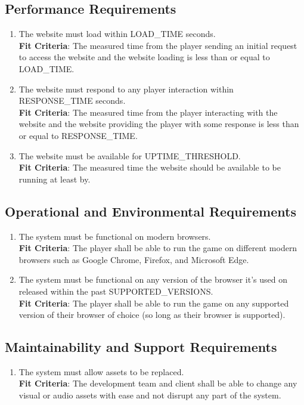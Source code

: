 \documentclass{article}
\begin{document}
\subsection{Performance Requirements}
\begin{enumerate}[{PR}1. ]
    \item The website must load within LOAD\_TIME seconds. \\
    \textbf{Fit Criteria}: The measured time from the player sending an initial request to access the website and the website loading is less than or equal to LOAD\_TIME.
    
    \item The website must respond to any player interaction within RESPONSE\_TIME seconds. \\
    \textbf{Fit Criteria}: The measured time from the player interacting with the website and the website providing the player with some response is less than or equal to RESPONSE\_TIME.
    
    \item The website must be available for UPTIME\_THRESHOLD. \\
    \textbf{Fit Criteria}: The measured time the website should be available to be running at least by.
\end{enumerate}

\subsection{Operational and Environmental Requirements}
\begin{enumerate}[{OE}1. ]
    \item The system must be functional on modern browsers. \\
    \textbf{Fit Criteria}: The player shall be able to run the game on different modern browsers such as Google Chrome, Firefox, and Microsoft Edge.
    
    \item The system must be functional on any version of the browser it's used on released within the past SUPPORTED\_VERSIONS. \\
    \textbf{Fit Criteria}: The player shall be able to run the game on any supported version of their browser of choice (so long as their browser is supported).
\end{enumerate}


\subsection{Maintainability and Support Requirements}
\begin{enumerate}[{MR}1. ]
    \label{MR1}
    \item The system must allow assets to be replaced. \\
    \textbf{Fit Criteria}: The development team and client shall be able to change any visual or audio assets with ease and not disrupt any part of the system.
    

\end{enumerate}
\end{document}
